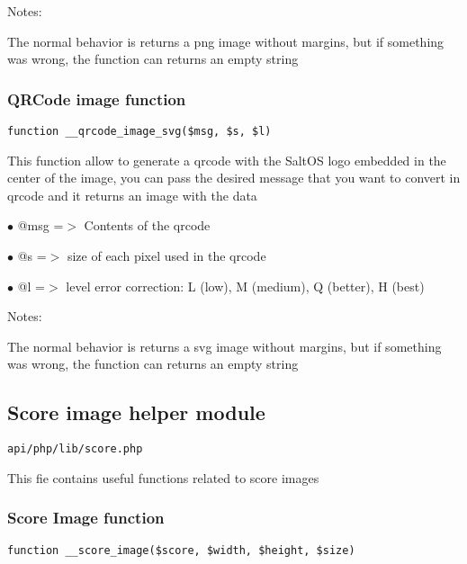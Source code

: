 \documentclass[a4paper]{article}
\begin{document}
Notes:

The normal behavior is returns a png image without margins, but if something
was wrong, the function can returns an empty string

\hypertarget{toc524}{}
\subsubsection{QRCode image function}

\begin{lstlisting}
function __qrcode_image_svg($msg, $s, $l)
\end{lstlisting}

This function allow to generate a qrcode with the SaltOS logo embedded
in the center of the image, you can pass the desired message that you
want to convert in qrcode and it returns an image with the data

\begin{compactitem}
\item[\color{myblue}$\bullet$] @msg =$>$ Contents of the qrcode
\item[\color{myblue}$\bullet$] @s   =$>$ size of each pixel used in the qrcode
\item[\color{myblue}$\bullet$] @l   =$>$ level error correction: L (low), M (medium), Q (better), H (best)
\end{compactitem}

Notes:

The normal behavior is returns a svg image without margins, but if something
was wrong, the function can returns an empty string

\hypertarget{toc525}{}
\subsection{Score image helper module}

\begin{lstlisting}
api/php/lib/score.php
\end{lstlisting}

This fie contains useful functions related to score images

\hypertarget{toc526}{}
\subsubsection{Score Image function}

\begin{lstlisting}
function __score_image($score, $width, $height, $size)
\end{lstlisting}
\end{document}
